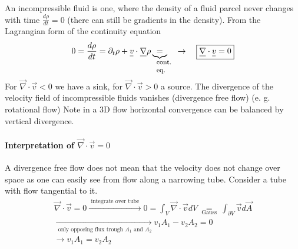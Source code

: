 An incompressible fluid is one, where the density of a fluid parcel never changes with time $\frac{d\rho}{dt} = 0$ (there can still be gradients in the density). From the Lagrangian form of the continuity equation
\begin{equation}
    0 = \frac{d\rho}{dt} = \partial_t \rho + \vec{v} \cdot \vec{\nabla} \rho \explain{=}{cont. eq.}  \quad \rightarrow \quad \boxed{\vec{\nabla} \cdot \vec{v} = 0}
\end{equation}
For $\vec{\nabla}\cdot \vec{v} < 0$ we have a sink, for $\vec{\nabla}\cdot \vec{v} > 0$ a source.
The divergence of the velocity field of incompressible fluids vanishes (divergence free flow) (e. g. rotational flow)
Note in a 3D flow horizontal convergence can be balanced by vertical divergence.
\paragraph{Interpretation of $\vec{\nabla}\cdot \vec{v} = 0$} A divergence free flow does not mean that the velocity does not change over space as one can easily see from flow along a narrowing tube.
Consider a tube with flow tangential to it.
\begin{equation}
    \begin{gathered}
    \vec{\nabla} \cdot \vec{v}=0 \xrightarrow{\text { integrate over tube }} 0=\int_V \vec{\nabla} \cdot \vec{v} d V \underset{\text { Gauss }}{=} \int_{\partial V} \vec{v} d \vec{A} \\
    \xrightarrow[\text { only opposing flux trough } A_1 \text { and } A_2]{} v_1 A_1-v_2 A_2=0 \\
    \rightarrow v_1 A_1=v_2 A_2
    \end{gathered}
\end{equation}

